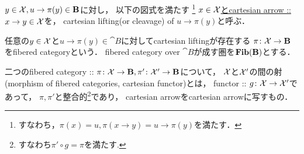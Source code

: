 \documentclass[a4paper, dvipdfmx]{jsarticle}
\begin{document}
\begin{Def}
\begin{myenum}
\item
    $y \in \mathcal{X}, u \to \pi(y) \in \mathbf{B}$に対し，
    以下の図式を満たす
    \footnote{すなわち，$\pi(x)=u, \pi(x \to y)=u \to \pi(y)$を満たす．}
    \underline{$x \in \mathcal{X}$とcartesian arrow :: $x \to y \in \mathcal{X}$}を，
    cartesian lifting(or cleavage) of $u \to \pi(y)$と呼ぶ．
    \begin{center}
    \end{center}

\item
    任意の$y \in \mathcal{X}$と$u \to \pi(y) \in \cat{B}$に対してcartesian liftingが存在する
    $\pi \colon \mathcal{X} \to \mathbf{B}$をfibered categoryという．
    fibered category over $\cat{B}$が成す圏を$\mathbf{Fib}(\mathbf{B})$とする．

\item
    二つのfibered category :: 
    $\pi \colon \mathcal{X} \to \mathbf{B}, \pi' \colon \mathcal{X}' \to \mathbf{B}$について，
    $\mathcal{X}$と$\mathcal{X}'$の間の射(morphism of fibered categories, cartesian functor)とは，
    functor :: $g \colon \mathcal{X} \to \mathcal{X}'$であって，
    $\pi, \pi'$と整合的\footnote{ すなわち$\pi' \circ g=\pi$を満たす. }であり，
    cartesian arrowをcartesian arrowに写すもの．

\item
\end{myenum}
\end{Def}
\end{document}
